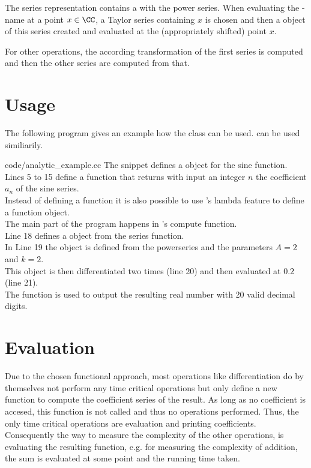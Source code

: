 		The series representation  contains a  with the power series.
		When evaluating the -name at a point $x \in \CC$, 
		a Taylor series containing $x$ is chosen and then a \baana object of this series created and evaluated at 
		the (appropriately shifted) point $x$. 

		For other operations, the according transformation of the first series is computed and then the 
		other series are computed from that.    
	\section{Usage}
		The following \cc program gives an example how the \baana class can be used. 
    \anarect can be used similiarily.
    
    {code/analytic_example.cc}
   The snippet defines a \baana object for the sine function.\\ 
   Lines 5 to 15 define a function that returns with input an integer $n$ the coefficient $a_n$ of the sine series.\\
   Instead of defining a function it is also possible to use {\ccx}'s lambda feature to define a function object. \\
   The main part of the program happens in {\irram}'s compute function. \\
   Line 18 defines a \powerseries object from the series function. \\
   In Line 19 the \baana object is defined from the powerseries and the parameters $A=2$ and $k=2$.\\
   This object is then differentiated two times (line 20) and then evaluated at $0.2$ (line 21). \\
   The  function is used to output the resulting real number with 20 valid decimal digits.
	\section{Evaluation}
		Due to the chosen functional approach, most operations like differentiation do by themselves not perform any time critical operations but only define a new function to compute the coefficient series of the result.
		As long as no coefficient is accesed, this function is not called and thus no operations performed.
		Thus, the only time critical operations are evaluation and printing coefficients.
		Consequently the way to measure the complexity of the other operations, is evaluating the resulting function, 
		e.g. for measuring the complexity of addition, the sum is evaluated at some point and the running time taken.


